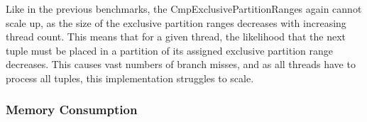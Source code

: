 Like in the previous benchmarks, the CmpExclusivePartitionRanges again cannot scale up, as the size of the exclusive partition ranges decreases with increasing thread count.
This means that for a given thread, the likelihood that the next tuple must be placed in a partition of its assigned exclusive partition range decreases.
This causes vast numbers of branch misses, and as all threads have to process all tuples, this implementation struggles to scale.

\subsubsection{Memory Consumption}
